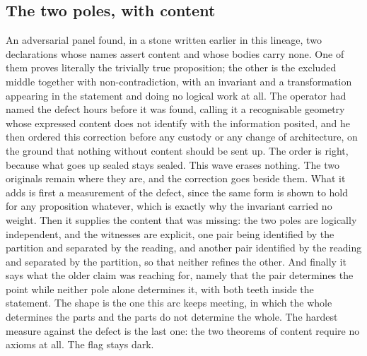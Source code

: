 \documentclass[11pt]{article}
\theoremstyle{definition}\newtheorem{deriv}{Derivation}
\begin{document}
\subsection*{The two poles, with content}An adversarial panel found, in a stone written earlier in this lineage, two declarations whose names assert content and whose bodies carry none. One of them proves literally the trivially true proposition; the other is the excluded middle together with non-contradiction, with an invariant and a transformation appearing in the statement and doing no logical work at all. The operator had named the defect hours before it was found, calling it a recognisable geometry whose expressed content does not identify with the information posited, and he then ordered this correction before any custody or any change of architecture, on the ground that nothing without content should be sent up. The order is right, because what goes up sealed stays sealed. This wave erases nothing. The two originals remain where they are, and the correction goes beside them. What it adds is first a measurement of the defect, since the same form is shown to hold for any proposition whatever, which is exactly why the invariant carried no weight. Then it supplies the content that was missing: the two poles are logically independent, and the witnesses are explicit, one pair being identified by the partition and separated by the reading, and another pair identified by the reading and separated by the partition, so that neither refines the other. And finally it says what the older claim was reaching for, namely that the pair determines the point while neither pole alone determines it, with both teeth inside the statement. The shape is the one this arc keeps meeting, in which the whole determines the parts and the parts do not determine the whole. The hardest measure against the defect is the last one: the two theorems of content require no axioms at all. The flag stays dark.
\end{document}
